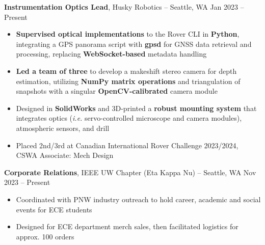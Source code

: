 \documentclass[11pt]{article}       %
\begin{document}
\textbf{Instrumentation Optics Lead}, Husky Robotics -- Seattle, WA \hfill Jan 2023 -- Present \\
\vspace{-9pt}
\begin{itemize}
  \item \textbf{Supervised optical implementations} to the Rover CLI in \textbf{Python}, integrating a GPS panorama script with \textbf{gpsd} for GNSS data retrieval and processing, replacing \textbf{WebSocket-based} metadata handling
  \item \textbf{Led a team of three} to develop a makeshift stereo camera for depth estimation, utilizing \textbf{NumPy matrix operations} and triangulation of snapshots with a singular \textbf{OpenCV-calibrated} camera module
  \item Designed in \textbf{SolidWorks} and 3D-printed a \textbf{robust mounting system} that integrates optics (\textit{i.e.} servo-controlled microscope and camera modules), atmospheric sensors, and drill
  \item Placed 2nd/3rd at Canadian International Rover Challenge 2023/2024, CSWA Associate: Mech Design
\end{itemize}

\textbf{Corporate Relations}, IEEE UW Chapter (Eta Kappa Nu) -- Seattle, WA \hfill Nov 2023 -- Present \\
\vspace{-9pt}
\begin{itemize}
  \item Coordinated with PNW industry outreach to hold career, academic and social events for ECE students
  \item Designed for ECE department merch sales, then facilitated logistics for approx. 100 orders
\end{itemize}

\vspace{-6.5pt}
\end{document}
